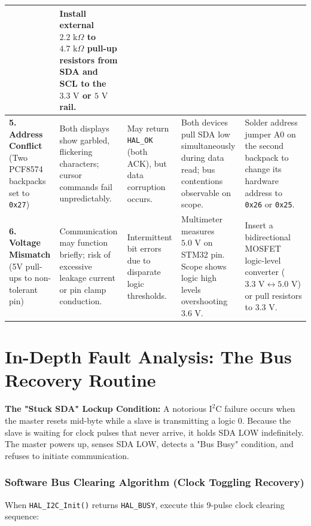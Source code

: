 \documentclass[11pt,a4paper]{article}
\begin{document}
\begin{table}[h!]
\begin{tabularx}{\textwidth}{p{2.3cm} p{2.5cm} p{2.2cm} p{2.6cm} X}
    & Install external $2.2\text{ k}\Omega$ to $4.7\text{ k}\Omega$ pull-up resistors from SDA and SCL to the $3.3\text{ V}$ or $5\text{ V}$ rail. \\
\midrule
\textbf{5. Address Conflict} \newline (Two PCF8574 backpacks set to \texttt{0x27}) 
    & Both displays show garbled, flickering characters; cursor commands fail unpredictably. 
    & May return \texttt{HAL\_OK} (both ACK), but data corruption occurs. 
    & Both devices pull SDA low simultaneously during data read; bus contentions observable on scope. 
    & Solder address jumper A0 on the second backpack to change its hardware address to \texttt{0x26} or \texttt{0x25}. \\
\midrule
\textbf{6. Voltage Mismatch} \newline (5V pull-ups to non-tolerant pin) 
    & Communication may function briefly; risk of excessive leakage current or pin clamp conduction. 
    & Intermittent bit errors due to disparate logic thresholds. 
    & Multimeter measures $5.0\text{ V}$ on STM32 pin. Scope shows logic high levels overshooting $3.6\text{ V}$. 
    & Insert a bidirectional MOSFET logic-level converter ($3.3\text{ V} \leftrightarrow 5.0\text{ V}$) or pull resistors to $3.3\text{ V}$. \\
\bottomrule
\end{tabularx}
\end{table}

\section{In-Depth Fault Analysis: The Bus Recovery Routine}
\begin{troublebox}
\textbf{The "Stuck SDA" Lockup Condition:} A notorious $\text{I}^2\text{C}$ failure occurs when the master resets mid-byte while a slave is transmitting a logic $0$. Because the slave is waiting for clock pulses that never arrive, it holds SDA LOW indefinitely. The master powers up, senses SDA LOW, detects a "Bus Busy" condition, and refuses to initiate communication.
\end{troublebox}

\subsubsection*{Software Bus Clearing Algorithm (Clock Toggling Recovery)}
When \texttt{HAL\_I2C\_Init()} returns \texttt{HAL\_BUSY}, execute this 9-pulse clock clearing sequence:
\end{document}
